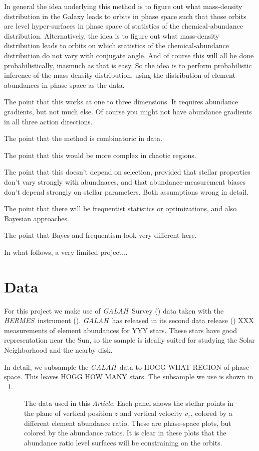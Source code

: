 \documentclass[modern]{aastex62}
\newcommand{\documentname}{\textsl{Article}}
\newcommand{\acronym}[1]{{\small{#1}}}
\newcommand{\project}[1]{\textsl{#1}}
\newcommand{\galah}{\project{\acronym{GALAH}}}
\newcommand{\hermes}{\project{\acronym{HERMES}}}
\begin{document}
In general the idea underlying this method is to figure out what mass-density distribution
in the Galaxy leads to orbits in phase space such that those orbits are level
hyper-surfaces in phase space of statistics of the chemical-abundance distribution.
Alternatively, the idea is to figure out what mass-density distribution leads to orbits
on which statistics of the chemical-abundance distribution do not vary with conjugate
angle.
And of course this will all be done probabilistically, inasmuch as that is easy.
So the idea is to perform probabilistic inference of the mass-density distribution, using
the distribution of element abundances in phase space as the data.

The point that this works at one to three dimensions. It requires abundance gradients, but
not much else. Of course you might not have abundance gradients in all three action directions.

The point that the method is combinatoric in data.

The point that this would be more complex in chaotic regions.

The point that this doesn't depend on selection, provided that stellar properties don't vary
strongly with abundnaces, and that abundance-measurement biases don't depend strongly on stellar
parameters. Both assumptions wrong in detail.

The point that there will be frequentist statistics or optimizations, and also Bayesian
approaches.

The point that Bayes and frequentism look very different here.

In what follows, a very limited project...

\section{Data}

For this project we make use of \galah\ Survey (\citealt{galah, galah2}) data taken
with the \hermes\ instrument (\citealt{hermes10, hermes15}).
\galah\ has released in its second data release (\citealt{galahdr2})
XXX measurements of element abundances for YYY stars.
These stars have good representation near the Sun, so the sample is ideally suited for studying
the Solar Neighborhood and the nearby disk.

In detail, we subsample the \galah\ data to HOGG WHAT REGION of phase space.
This leaves HOGG HOW MANY stars.
The subsample we use is shown in \figurename~\ref{fig:data}.
\begin{figure}
\caption{The data used in this \documentname.
Each panel shows the stellar points in the plane
of vertical position $z$ and vertical velocity $v_z$,
colored by a different element abundance ratio.
These are phase-space plots, but colored by the abundance ratios.
It is clear in these plots that the abundance ratio level surfaces will be
constraining on the orbits.\label{fig:data}}
\end{figure}
\end{document}
